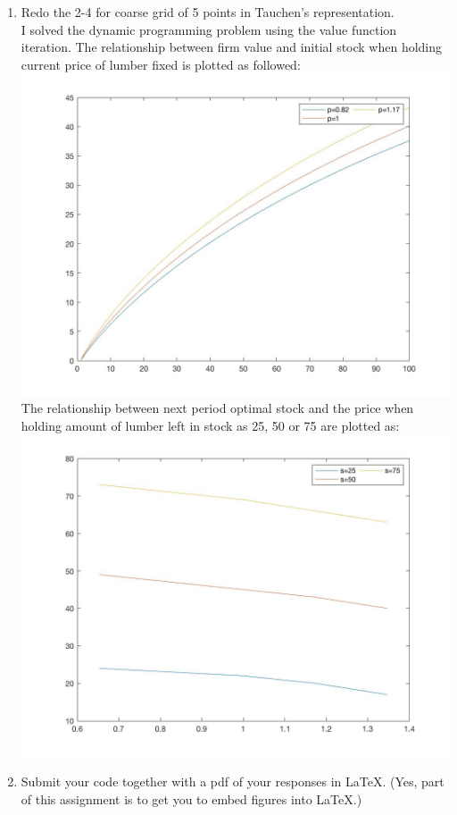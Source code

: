 \documentclass[11pt]{article}
\begin{document}
\begin{enumerate}
\item Redo the 2-4 for coarse grid of 5 points in Tauchen's representation.\\[1em]

I solved the dynamic programming problem using the value function iteration. The relationship between firm value and initial stock when holding current price of lumber fixed is plotted as followed: \\
    \includegraphics[scale=0.2]{Vs0_5.jpg} \\
The relationship between next period optimal stock and the price when holding amount of lumber left in stock as 25, 50 or 75 are plotted as:\\
    \includegraphics[scale=0.2]{sp_5.jpg}

\item Submit your code together with a pdf of your responses in \LaTeX. (Yes, part of this assignment is to get you to embed figures into \LaTeX.)
\end{enumerate}
\end{document}
